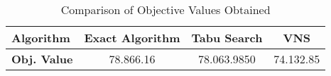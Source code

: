 \documentclass[]{article}
\begin{document}
\begin{table}[htbp]
	\centering
	\begin{tabular}{lccc}
		\hline
		\textbf{Algorithm} & \textbf{Exact Algorithm} & \textbf{Tabu Search} & \textbf{VNS} \\
		\hline
		\textbf{Obj. Value} & 78.866.16 & 78.063.9850 & 74.132.85 \\
		\hline
	\end{tabular}
	\caption{Comparison of Objective Values Obtained}
	\label{tab:transposed_results}
\end{table}
\end{document}
